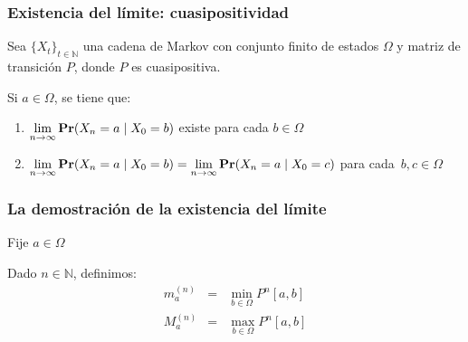 \begin{frame}
\frametitle{Existencia del límite: cuasipositividad}

{\footnotesize

Sea $\{ X_t \}_{t \in \mathbb{N}}$ una cadena de Markov con conjunto finito de estados $\Omega$ y matriz de transición $P$, donde $P$ es cuasipositiva.


\begin{teorema}
Si $a \in \Omega$, se tiene que:
\begin{enumerate}
\item ${\displaystyle \lim_{n \to \infty} {\rm {\bf Pr}}(X_n = a \mid X_0 = b)}$ existe para cada $b \in \Omega$


\item ${\displaystyle \lim_{n \to \infty} {\rm {\bf Pr}}(X_n = a \mid X_0 = b) =\lim_{n \to \infty} {\rm {\bf Pr}}(X_n = a \mid X_0 = c)}$ para cada~$b, c \in \Omega$
\end{enumerate}
\end{teorema}




}

\end{frame}

\begin{frame}
\frametitle{La demostración de la existencia del límite}

{\small

Fije $a \in \Omega$


Dado $n \in \mathbb{N}$, definimos:
\alert{
\begin{eqnarray*}
m_a^{(n)} & = & \min_{b \in \Omega} P^n[a, b] \\
M_a^{(n)} & = & \max_{b \in \Omega} P^n[a, b]
\end{eqnarray*}
}

}
    
\end{frame}

